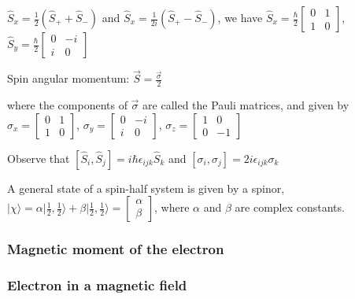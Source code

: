 $\widehat{S}_x = \frac{1}{2}(\widehat{S}_{+} + \widehat{S}_{-})$ and $\widehat{S}_x = \frac{1}{2i}(\widehat{S}_{+} - \widehat{S}_{-})$, we have $\widehat{S}_x = \frac{\hbar}{2} \begin{bmatrix} 0 & 1 \\ 1 & 0 \end{bmatrix}$, $\widehat{S}_y = \frac{\hbar}{2} \begin{bmatrix} 0 & -i \\ i & 0 \end{bmatrix}$

Spin angular momentum: $\vec{S} = \frac{\vec{\sigma}}{2}$

where the components of $\vec{\sigma}$ are called the Pauli matrices, and given by $\sigma_x = \begin{bmatrix} 0 & 1 \\ 1 & 0 \end{bmatrix}$, $\sigma_y = \begin{bmatrix} 0 & -i \\ i & 0 \end{bmatrix}$, $\sigma_z = \begin{bmatrix} 1 & 0 \\ 0 & -1 \end{bmatrix}$

Observe that $[\widehat{S}_i, \widehat{S}_j] = i \hbar \epsilon_{ijk} \widehat{S}_k$ and $[\sigma_i, \sigma_j] = 2 i \epsilon_{ijk} \sigma_k$

A general state of a spin-half system is given by a spinor, $|\chi \rangle = \alpha | \frac{1}{2}, \frac{1}{2} \rangle + \beta | \frac{1}{2}, \frac{1}{2} \rangle = \begin{bmatrix} \alpha \\ \beta \end{bmatrix}$, where $\alpha$ and $\beta$ are complex constants.


\subsubsection{Magnetic moment of the electron}

\subsubsection{Electron in a magnetic field}

